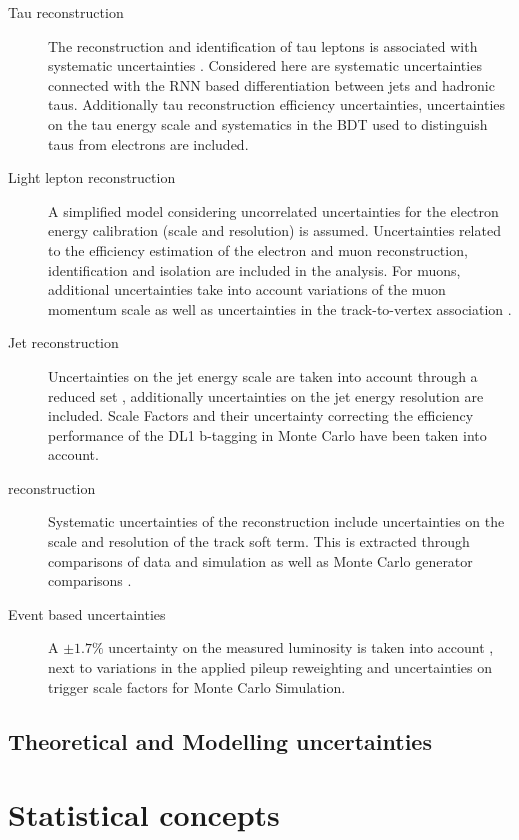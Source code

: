 \begin{description}
\item[Tau reconstruction] The reconstruction and identification of tau leptons is associated with systematic uncertainties \cite{TauRNNID}.  Considered here are systematic uncertainties connected with the \ac{RNN} based differentiation between jets and hadronic taus.  Additionally tau reconstruction efficiency uncertainties,  uncertainties on the tau energy scale and systematics in the \ac{BDT} used to distinguish taus from electrons  are included.
\item[Light lepton reconstruction] A simplified model considering uncorrelated uncertainties for the electron energy calibration (scale and resolution) is assumed\cite{ElecCalibration}. Uncertainties related to the efficiency estimation of the electron and muon reconstruction,  identification and isolation are included in the analysis.  For muons, additional uncertainties take into account variations of the muon momentum scale as well as uncertainties in the track-to-vertex association \cite{MuonID}.
\item[Jet reconstruction] Uncertainties on the jet energy scale are taken into account through a reduced set \cite{JESJER},  additionally uncertainties on the jet energy resolution are included.  Scale Factors and their uncertainty correcting the efficiency performance of the DL1 b-tagging in Monte Carlo have been taken into account.
\item[\Met reconstruction] Systematic uncertainties of the \Met reconstruction include uncertainties on the scale and resolution of the track soft term.  This is extracted through comparisons of data and simulation as well as Monte Carlo generator comparisons \cite{MetPerformance}.
\item[Event based uncertainties] A $\pm 1.7  \%$ uncertainty on the measured luminosity is taken into account \cite{Lumi},  next to variations in the applied pileup reweighting and uncertainties on trigger scale factors for Monte Carlo Simulation.   
\end{description}

\subsection{Theoretical and Modelling uncertainties}
\label{subsec:theoUnc}


\section{Statistical concepts}
\label{sec:analysis:stats}


